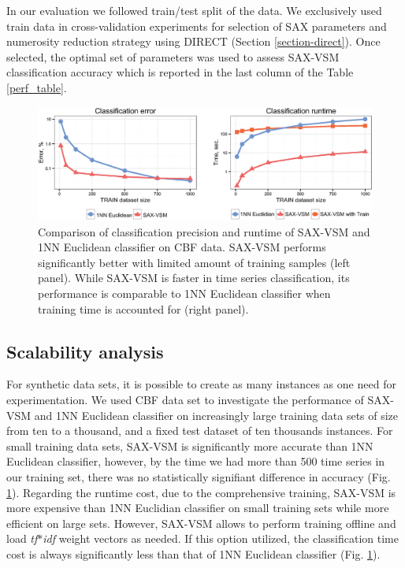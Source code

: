 \documentclass{llncs}
\newcommand{\myfigureshrinkerless}{\vspace{-0.2cm}}
\begin{document}
In our evaluation we followed train/test split of the data. We exclusively used train data in 
cross-validation experiments for selection of SAX parameters and numerosity reduction strategy
using DIRECT (Section \ref{section-direct}). Once selected, the optimal set of parameters 
was used to assess SAX-VSM classification accuracy which is reported in the last column 
of the Table \ref{perf_table}.

\begin{figure}[b]
   \myfigureshrinkerless
   \centering
   \includegraphics[width=115mm]{figures/precision-runtime.eps}
   \caption{Comparison of classification precision and runtime of SAX-VSM and 1NN 
   Euclidean classifier on CBF data. SAX-VSM performs significantly better with limited 
   amount of training samples (left panel). While SAX-VSM is faster in time series 
   classification, its performance is comparable to 1NN Euclidean classifier when 
   training time is accounted for (right panel).}
   \label{fig:precision-runtime}
\end{figure}

\subsection{Scalability analysis}
For synthetic data sets, it is possible to create as many instances as one need for experimentation.
We used CBF data set \cite{cbf} to investigate the performance of SAX-VSM and 1NN Euclidean
classifier on increasingly large training data sets of size from ten to a thousand, and a fixed test
dataset of ten thousands instances. For small training data sets, SAX-VSM is significantly more
accurate than 1NN Euclidean classifier, however, by the time we had more than 500 time series in
our training set, there was no statistically signifiant difference in accuracy (Fig.
\ref{fig:precision-runtime}). 
Regarding the runtime cost, due to the comprehensive training, SAX-VSM is more expensive than 
1NN Euclidian classifier on small training sets while more efficient on large sets.
However, SAX-VSM allows to perform training offline and load \textit{tf$\ast$idf} weight vectors as
needed. If this option utilized, the classification time cost is always significantly less than that
of 1NN Euclidean classifier (Fig. \ref{fig:precision-runtime}).
\end{document}
